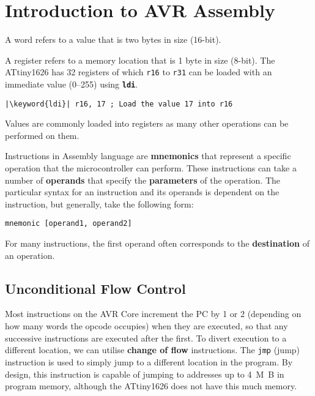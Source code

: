 \documentclass{article}
\newcommand{\keyword}[1]{\textcolor[rgb]{0.00,0.50,0.00}{\textbf{#1}}}
\newcommand{\keywordinline}[1]{\textcolor[rgb]{0.00,0.50,0.00}{\textbf{\texttt{#1}}}}
\begin{document}
\section{Introduction to AVR Assembly}
\begin{definition}[Word]
    A word refers to a value that is two bytes in size (16-bit).
\end{definition}
\begin{definition}[Registers]
    A register refers to a memory location that is 1 byte in size (8-bit).
    The ATtiny1626 has 32 registers of which \texttt{r16} to
    \texttt{r31} can be loaded with an immediate value
    (\numrange{0}{255}) using \keywordinline{ldi}.
    \begin{verbatim}
|\keyword{ldi}| r16, 17 ; Load the value 17 into r16
    \end{verbatim}
    Values are commonly loaded into registers as many other operations
    can be performed on them.
\end{definition}
Instructions in Assembly language are \textbf{mnemonics} that represent
a specific operation that the microcontroller can perform. These
instructions can take a number of \textbf{operands} that specify the
\textbf{parameters} of the operation. The particular syntax for an
instruction and its operands is dependent on the instruction, but
generally, take the following form:
\begin{verbatim}
mnemonic [operand1, operand2]
\end{verbatim}
For many instructions, the first operand often corresponds to the
\textbf{destination} of an operation.
\subsection{Unconditional Flow Control}
Most instructions on the AVR Core increment the PC by 1 or 2 (depending
on how many words the opcode occupies) when they are executed, so that
any successive instructions are executed after the first. To divert
execution to a different location, we can utilise \textbf{change of
flow} instructions. The \texttt{jmp} (jump) instruction is
used to simply jump to a different location in the program. By design,
this instruction is capable of jumping to addresses up to \qty{4}{M.B}
in program memory, although the ATtiny1626 does not have this much
memory.
\end{document}
